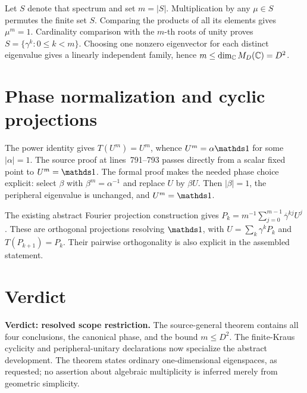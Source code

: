 \documentclass[11pt]{article}
\begin{document}
Let $S$ denote that spectrum and set $m=|S|$. Multiplication by any
$\mu\in S$ permutes the finite set $S$. Comparing the products of all
its elements gives $\mu^m=1$. Cardinality comparison with the $m$-th roots
of unity proves $S=\{\gamma^k:0\leq k<m\}$. Choosing one nonzero eigenvector
for each distinct eigenvalue gives a linearly independent family, hence
$m\leq\dim_{\mathbb{C}}M_{D}(\mathbb{C})=D^2$.

\section{Phase normalization and cyclic projections}

The power identity gives $T(U^m)=U^m$, whence $U^m=\alpha\Id$ for some
$|\alpha|=1$. The source proof at lines~791--793 passes directly from a
scalar fixed point to $U^m=\Id$. The formal proof makes the needed phase
choice explicit: select $\beta$ with $\beta^m=\alpha^{-1}$ and replace $U$
by $\beta U$. Then $|\beta|=1$, the peripheral eigenvalue is unchanged,
and $U^m=\Id$.

The existing abstract Fourier projection construction gives
$P_k=m^{-1}\sum_{j=0}^{m-1}\overline{\gamma}^{kj}U^j$. These are orthogonal
projections resolving $\Id$, with $U=\sum_k\gamma^kP_k$ and
$T(P_{k+1})=P_k$. Their pairwise orthogonality is also explicit in the
assembled statement.

\section{Verdict}

\textbf{Verdict: resolved scope restriction.} The source-general theorem
contains all four conclusions, the canonical phase, and the bound
$m\leq D^2$. The finite-Kraus cyclicity and peripheral-unitary declarations
now specialize the abstract development. The theorem states ordinary
one-dimensional eigenspaces, as requested; no assertion about algebraic
multiplicity is inferred merely from geometric simplicity.



\end{document}
